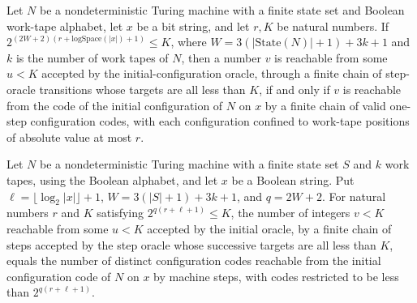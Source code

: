 \begin{lemma}
\label{Complexity.LogProg.ExpBFS.cl_iff}
\leanok
{}
Let $N$ be a nondeterministic Turing machine with a finite state set and Boolean
work-tape alphabet, let $x$ be a bit string, and let $r,K$ be natural numbers. If
$2^{(2W+2)(r+\mathrm{logSpace}(|x|)+1)}\le K$, where $W=3(|\mathrm{State}(N)|+1)+3k+1$
and $k$ is the number of work tapes of $N$, then a number $v$ is reachable from some
$u<K$ accepted by the initial-configuration oracle, through a finite chain of
step-oracle transitions whose targets are all less than $K$, if and only if $v$ is
reachable from the code of the initial configuration of $N$ on $x$ by a finite chain of
valid one-step configuration codes, with each configuration confined to work-tape
positions of absolute value at most $r$.
\end{lemma}

\begin{lemma}
\label{Complexity.LogProg.ExpBFS.card_cl}
\leanok
{}
Let $N$ be a nondeterministic Turing machine with a finite state set $S$ and $k$ work
tapes, using the Boolean alphabet, and let $x$ be a Boolean string. Put
$\ell=\lfloor\log_2 |x|\rfloor+1$, $W=3(|S|+1)+3k+1$, and $q=2W+2$. For natural numbers
$r$ and $K$ satisfying $2^{q(r+\ell+1)}\le K$, the number of integers $v<K$ reachable
from some $u<K$ accepted by the initial oracle, by a finite chain of steps accepted by
the step oracle whose successive targets are all less than $K$, equals the number of
distinct configuration codes reachable from the initial configuration code of $N$ on $x$
by machine steps, with codes restricted to be less than $2^{q(r+\ell+1)}$.
\end{lemma}

